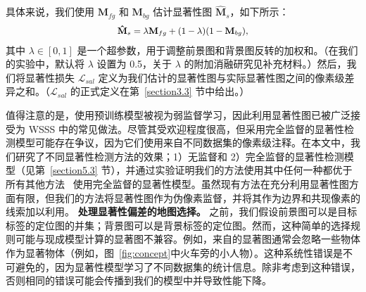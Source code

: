 \documentclass[final]{cvpr}
\begin{document}
具体来说，我们使用 $
\mathbf{M}_{fg}$ 和 $
\mathbf{M}_{bg}$ 估计显著性图 $
\mathbf{\hat{M}}_{s}$，如下所示：\vspace{-1mm}
\begin{equation}
\label{eq_esimate_sal}
{\small
\begin{split}
\mathbf{\hat{M}}_{s} = \lambda\mathbf{M}_{fg} + (1-\lambda)(1-\mathbf{M}_{bg}),
\end{split}}\vspace{-1mm}
\end{equation}
\noindent 其中 $\lambda \in [0, 1]$ 是一个超参数，用于调整前景图和背景图反转的加权和。（在我们的实验中，默认将 $\lambda$ 设置为 0.5，关于 $\lambda$ 的附加消融研究见补充材料。）然后，我们将显著性损失 $\mathcal{L}_{sal}$ 定义为我们估计的显著性图与实际显著性图之间的像素级差异之和。（$\mathcal{L}_{sal}$ 的正式定义在第~\ref{section3.3} 节中给出。）

值得注意的是，使用预训练模型被视为弱监督学习，因此利用显著性图已被广泛接受为 WSSS 中的常见做法。尽管其受欢迎程度很高，但采用完全监督的显著性检测模型可能存在争议，因为它们使用来自不同数据集的像素级注释。在本文中，我们研究了不同显著性检测方法的效果；1）无监督和 2）完全监督的显著性检测模型（见第~\ref{section5.3} 节），并通过实验证明我们的方法使用其中任何一种都优于所有其他方法~\cite{fan2020learning,jiang2019integral,wang2018weakly, wei2016stc,yao2020saliency} 使用完全监督的显著性模型。虽然现有方法在充分利用显著性图方面有限，但我们的方法将显著性图作为伪像素监督，并将其作为边界和共现像素的线索加以利用。\vspace{1mm}
\noindent\textbf{处理显著性偏差的地图选择。} 之前，我们假设前景图可以是目标标签的定位图的并集；背景图可以是背景标签的定位图。然而，这种简单的选择规则可能与现成模型计算的显著图不兼容。例如，来自\cite{zhao2019pyramid}的显著图通常会忽略一些物体作为显著物体（例如，图~\ref{fig:concept}中火车旁的小人物）。这种系统性错误是不可避免的，因为显著性模型学习了不同数据集的统计信息。除非考虑到这种错误，否则相同的错误可能会传播到我们的模型中并导致性能下降。
\end{document}
